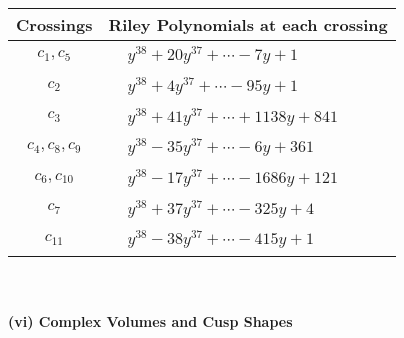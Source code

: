 \documentclass[1p]{elsarticle_modified}
\theoremstyle{definition}
\begin{document}
\begin{tabular}{m{50pt}|m{274pt}}
Crossings & \hspace{64pt}Riley Polynomials at each crossing \\
\hline $$\begin{aligned}c_{1},c_{5}\end{aligned}$$&$\begin{aligned}
&y^{38}+20 y^{37}+\cdots-7 y+1
\end{aligned}$\\
\hline $$\begin{aligned}c_{2}\end{aligned}$$&$\begin{aligned}
&y^{38}+4 y^{37}+\cdots-95 y+1
\end{aligned}$\\
\hline $$\begin{aligned}c_{3}\end{aligned}$$&$\begin{aligned}
&y^{38}+41 y^{37}+\cdots+1138 y+841
\end{aligned}$\\
\hline $$\begin{aligned}c_{4},c_{8},c_{9}\end{aligned}$$&$\begin{aligned}
&y^{38}-35 y^{37}+\cdots-6 y+361
\end{aligned}$\\
\hline $$\begin{aligned}c_{6},c_{10}\end{aligned}$$&$\begin{aligned}
&y^{38}-17 y^{37}+\cdots-1686 y+121
\end{aligned}$\\
\hline $$\begin{aligned}c_{7}\end{aligned}$$&$\begin{aligned}
&y^{38}+37 y^{37}+\cdots-325 y+4
\end{aligned}$\\
\hline $$\begin{aligned}c_{11}\end{aligned}$$&$\begin{aligned}
&y^{38}-38 y^{37}+\cdots-415 y+1
\end{aligned}$\\
\hline
\end{tabular}\\~\\
\newpage\flushleft \textbf{(vi) Complex Volumes and Cusp Shapes}
\end{document}
